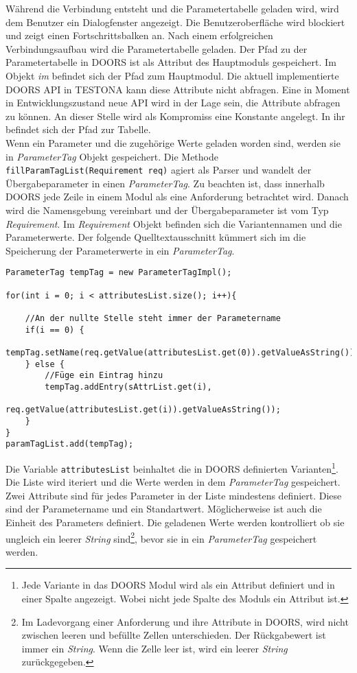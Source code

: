 Während die Verbindung entsteht und die Parametertabelle geladen wird, wird dem Benutzer ein Dialogfenster angezeigt. Die Benutzeroberfläche wird blockiert und zeigt einen Fortschrittsbalken an. Nach einem erfolgreichen Verbindungsaufbau wird die Parametertabelle geladen. Der Pfad zu der Parametertabelle in DOORS ist als Attribut des Hauptmoduls gespeichert. Im Objekt \textit{im} befindet sich der Pfad zum Hauptmodul. Die aktuell implementierte DOORS API in TESTONA kann diese Attribute nicht abfragen. Eine in Moment in Entwicklungszustand neue API wird in der Lage sein, die Attribute abfragen zu können. An dieser Stelle wird als Kompromiss eine Konstante angelegt. In ihr befindet sich der Pfad zur Tabelle.\\

 
Wenn ein Parameter und die zugehörige Werte geladen worden sind, werden sie in \textit{ParameterTag} Objekt gespeichert. Die Methode \texttt{fillParamTagList(Requirement req)} agiert als Parser und wandelt der Übergabeparameter in einen \textit{ParameterTag}. Zu beachten ist, dass innerhalb DOORS jede Zeile in einem Modul als eine Anforderung betrachtet wird. Danach wird die Namensgebung vereinbart und der Übergabeparameter ist vom Typ \textit{Requirement}. Im \textit{Requirement} Objekt befinden sich die Variantennamen und die Parameterwerte. Der folgende Quelltextausschnitt kümmert sich im die Speicherung der Parameterwerte in ein \textit{ParameterTag}.\\


\begin{lstlisting}[caption={Auszug von der Erstellung der ParameterTags}, captionpos=b,label={lst:CreateParamTag}]
ParameterTag tempTag = new ParameterTagImpl();
		
for(int i = 0; i < attributesList.size(); i++){
	
	//An der nullte Stelle steht immer der Parametername
	if(i == 0) {
		tempTag.setName(req.getValue(attributesList.get(0)).getValueAsString());
	} else {
		//Füge ein Eintrag hinzu 
		tempTag.addEntry(sAttrList.get(i),
				req.getValue(attributesList.get(i)).getValueAsString());
	}
}
paramTagList.add(tempTag);
\end{lstlisting}


Die Variable \texttt{attributesList} beinhaltet die in DOORS definierten Varianten\footnote{Jede Variante in das DOORS Modul wird als ein Attribut definiert und in einer Spalte angezeigt. Wobei nicht jede Spalte des Moduls ein Attribut ist.}. Die Liste wird iteriert und die Werte werden in dem \textit{ParameterTag} gespeichert. Zwei Attribute sind für jedes Parameter in der Liste mindestens definiert. Diese sind der Parametername und ein Standartwert. Möglicherweise ist auch die Einheit des Parameters definiert. Die geladenen Werte werden kontrolliert ob sie ungleich ein leerer \textit{String} sind\footnote{Im Ladevorgang einer Anforderung und ihre Attribute in DOORS, wird nicht zwischen leeren und befüllte Zellen unterschieden. Der Rückgabewert ist immer ein \textit{String}. Wenn die Zelle leer ist, wird ein leerer \textit{String} zurückgegeben.}, bevor sie in ein \textit{ParameterTag} gespeichert werden.\\


